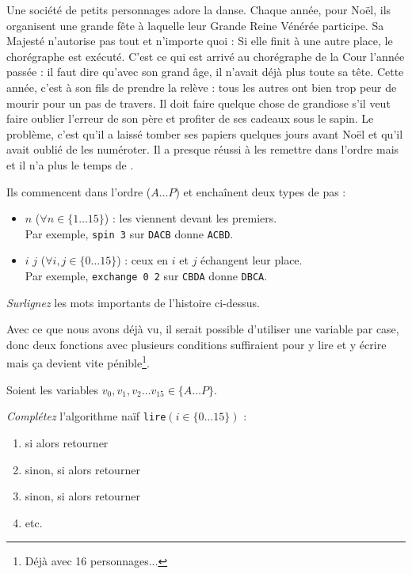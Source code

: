Une société de petits personnages adore la danse. Chaque année, pour Noël, ils
organisent une grande fête à laquelle leur Grande Reine Vénérée participe. Sa
Majesté n'autorise pas tout et n'importe quoi : 
Si elle finit à une autre place, le
chorégraphe est exécuté. C'est ce qui est arrivé au chorégraphe de la Cour
l'année passée : il faut dire qu'avec son grand âge, il n'avait déjà plus toute
sa tête. Cette année, c'est à son fils de prendre la relève : tous les autres
ont bien trop peur de mourir pour un pas de travers. Il doit faire quelque
chose de grandiose s'il veut faire oublier l'erreur de son père et profiter de
ses cadeaux sous le sapin.
Le problème, c'est qu'il a laissé tomber ses papiers quelques
jours avant Noël et qu'il avait oublié de les numéroter.
Il a presque réussi à les remettre dans l'ordre mais  et il n'a plus le temps de .

Ils commencent dans l'ordre (${A\dots P}$) et enchaînent deux types de pas :
\begin{itemize}
\item {} $n$ ($\forall n \in \{1\dots15\}$) :
	les  viennent devant les premiers. \\
	Par exemple, \texttt{spin 3} sur \texttt{DACB} donne \texttt{ACBD}.
\item {} $i$ $j$ ($\forall i,j \in \{0\dots15\}$) :
	ceux en $i$ et $j$ échangent leur place. \\
	Par exemple, \texttt{exchange 0 2} sur \texttt{CBDA} donne \texttt{DBCA}.
\end{itemize}

\begin{exo}
\emph{Surlignez} les mots importants de l'histoire ci-dessus.
\end{exo}

Avec ce que nous avons déjà vu, il serait possible d'utiliser une variable par
case, donc deux fonctions avec plusieurs conditions suffiraient pour y lire et
y écrire mais ça devient vite pénible\footnote{Déjà avec 16 personnages...}.

Soient les variables $v_0, v_1, v_2\dots v_{15} \in\{A\dots P\}$.

\begin{exo}
\emph{Complétez} l'algorithme naïf \texttt{lire}$(i\in\{0\dots15\})$ :
\begin{enumerate}
\item si  alors retourner 
\item sinon, si  alors retourner 
\item sinon, si  alors retourner 
\item etc.
\end{enumerate}
\end{exo}

